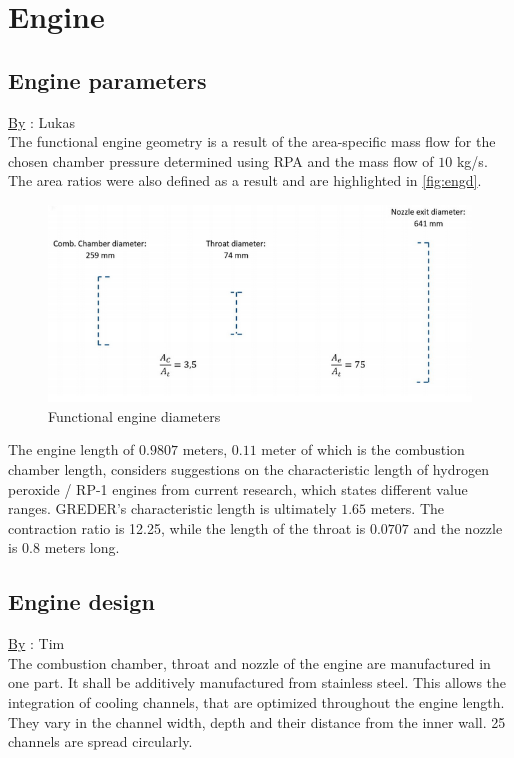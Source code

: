 \section{Engine}
\subsection{Engine parameters}
\qquad \underline{By} : Lukas\\

The functional engine geometry is a result of the area-specific mass flow for the chosen
chamber pressure determined using RPA and the mass flow of $10$ kg/s. The area ratios were
also defined as a result and are highlighted in \autoref{fig:engd}.

\begin{figure}[H]
	\centering
	\includegraphics[width=0.7\linewidth]{enginediameter}
	\caption{Functional engine diameters}\label{fig:engd}
\end{figure}
The engine length of $0.9807$ meters, $0.11$ meter of which is the combustion chamber length,
considers suggestions on the characteristic length of hydrogen peroxide / RP-1 engines from
current research, which states different value ranges. GREDER’s characteristic length is
ultimately $1.65$ meters. The contraction ratio is 12.25, while the length of the throat is $0.0707$
and the nozzle is $0.8$ meters long.
\subsection{Engine design}
\qquad \underline{By} : Tim\\

The combustion chamber, throat and nozzle of the engine are manufactured in one part. It shall be
additively manufactured from stainless steel. This allows the integration of cooling channels, that are
optimized throughout the engine length. They vary in the channel width, depth and their distance from
the inner wall. 25 channels are spread circularly.\\

